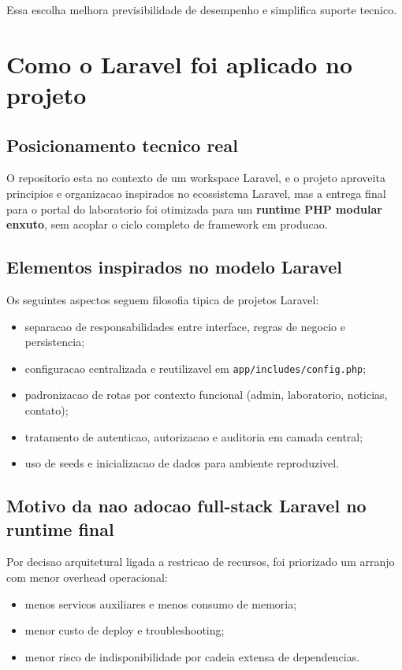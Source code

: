 \documentclass[12pt,a4paper]{article}
\begin{document}
Essa escolha melhora previsibilidade de desempenho e simplifica suporte tecnico.

\section{Como o Laravel foi aplicado no projeto}
\subsection{Posicionamento tecnico real}
O repositorio esta no contexto de um workspace Laravel, e o projeto aproveita principios e organizacao inspirados no ecossistema Laravel, mas a entrega final para o portal do laboratorio foi otimizada para um \textbf{runtime PHP modular enxuto}, sem acoplar o ciclo completo de framework em producao.

\subsection{Elementos inspirados no modelo Laravel}
Os seguintes aspectos seguem filosofia tipica de projetos Laravel:
\begin{itemize}
\item separacao de responsabilidades entre interface, regras de negocio e persistencia;
\item configuracao centralizada e reutilizavel em \texttt{app/includes/config.php};
\item padronizacao de rotas por contexto funcional (admin, laboratorio, noticias, contato);
\item tratamento de autenticao, autorizacao e auditoria em camada central;
\item uso de seeds e inicializacao de dados para ambiente reproduzivel.
\end{itemize}

\subsection{Motivo da nao adocao full-stack Laravel no runtime final}
Por decisao arquitetural ligada a restricao de recursos, foi priorizado um arranjo com menor overhead operacional:
\begin{itemize}
\item menos servicos auxiliares e menos consumo de memoria;
\item menor custo de deploy e troubleshooting;
\item menor risco de indisponibilidade por cadeia extensa de dependencias.
\end{itemize}
\end{document}
